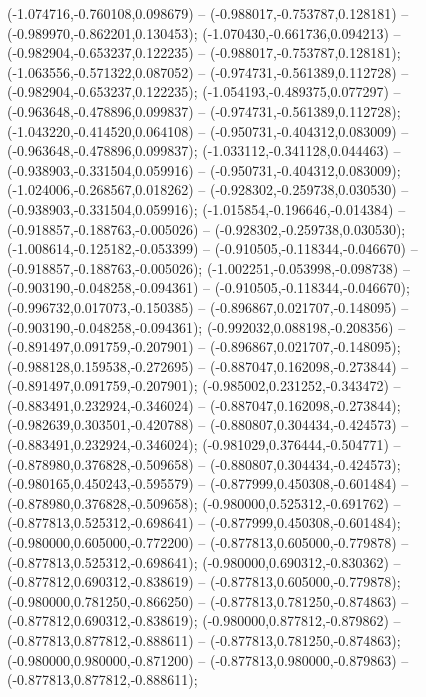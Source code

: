  (-1.074716,-0.760108,0.098679) -- (-0.988017,-0.753787,0.128181) -- (-0.989970,-0.862201,0.130453);
 (-1.070430,-0.661736,0.094213) -- (-0.982904,-0.653237,0.122235) -- (-0.988017,-0.753787,0.128181);
 (-1.063556,-0.571322,0.087052) -- (-0.974731,-0.561389,0.112728) -- (-0.982904,-0.653237,0.122235);
 (-1.054193,-0.489375,0.077297) -- (-0.963648,-0.478896,0.099837) -- (-0.974731,-0.561389,0.112728);
 (-1.043220,-0.414520,0.064108) -- (-0.950731,-0.404312,0.083009) -- (-0.963648,-0.478896,0.099837);
 (-1.033112,-0.341128,0.044463) -- (-0.938903,-0.331504,0.059916) -- (-0.950731,-0.404312,0.083009);
 (-1.024006,-0.268567,0.018262) -- (-0.928302,-0.259738,0.030530) -- (-0.938903,-0.331504,0.059916);
 (-1.015854,-0.196646,-0.014384) -- (-0.918857,-0.188763,-0.005026) -- (-0.928302,-0.259738,0.030530);
 (-1.008614,-0.125182,-0.053399) -- (-0.910505,-0.118344,-0.046670) -- (-0.918857,-0.188763,-0.005026);
 (-1.002251,-0.053998,-0.098738) -- (-0.903190,-0.048258,-0.094361) -- (-0.910505,-0.118344,-0.046670);
 (-0.996732,0.017073,-0.150385) -- (-0.896867,0.021707,-0.148095) -- (-0.903190,-0.048258,-0.094361);
 (-0.992032,0.088198,-0.208356) -- (-0.891497,0.091759,-0.207901) -- (-0.896867,0.021707,-0.148095);
 (-0.988128,0.159538,-0.272695) -- (-0.887047,0.162098,-0.273844) -- (-0.891497,0.091759,-0.207901);
 (-0.985002,0.231252,-0.343472) -- (-0.883491,0.232924,-0.346024) -- (-0.887047,0.162098,-0.273844);
 (-0.982639,0.303501,-0.420788) -- (-0.880807,0.304434,-0.424573) -- (-0.883491,0.232924,-0.346024);
 (-0.981029,0.376444,-0.504771) -- (-0.878980,0.376828,-0.509658) -- (-0.880807,0.304434,-0.424573);
 (-0.980165,0.450243,-0.595579) -- (-0.877999,0.450308,-0.601484) -- (-0.878980,0.376828,-0.509658);
 (-0.980000,0.525312,-0.691762) -- (-0.877813,0.525312,-0.698641) -- (-0.877999,0.450308,-0.601484);
 (-0.980000,0.605000,-0.772200) -- (-0.877813,0.605000,-0.779878) -- (-0.877813,0.525312,-0.698641);
 (-0.980000,0.690312,-0.830362) -- (-0.877812,0.690312,-0.838619) -- (-0.877813,0.605000,-0.779878);
 (-0.980000,0.781250,-0.866250) -- (-0.877813,0.781250,-0.874863) -- (-0.877812,0.690312,-0.838619);
 (-0.980000,0.877812,-0.879862) -- (-0.877813,0.877812,-0.888611) -- (-0.877813,0.781250,-0.874863);
 (-0.980000,0.980000,-0.871200) -- (-0.877813,0.980000,-0.879863) -- (-0.877813,0.877812,-0.888611);
